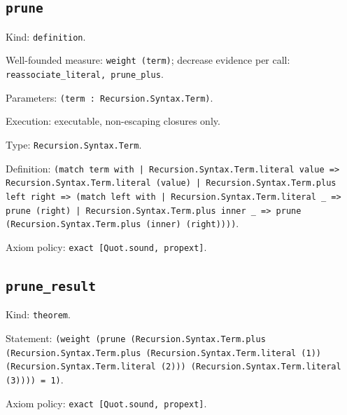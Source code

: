 \documentclass[11pt]{article}
\begin{document}
\subsection*{\texttt{prune}}
\noindent Kind: \texttt{definition}.\par
\noindent Well-founded measure: \texttt{weight (term)}; decrease evidence per call: \texttt{reassociate\_literal, prune\_plus}.\par
\noindent Parameters: \texttt{(term : Recursion.Syntax.Term)}.\par
\noindent Execution: executable, non-escaping closures only.\par
\noindent Type: \texttt{Recursion.Syntax.Term}.\par
\noindent Definition: \texttt{(match term with | Recursion.Syntax.Term.literal value => Recursion.Syntax.Term.literal (value) | Recursion.Syntax.Term.plus left right => (match left with | Recursion.Syntax.Term.literal \_ => prune (right) | Recursion.Syntax.Term.plus inner \_ => prune (Recursion.Syntax.Term.plus (inner) (right))))}.\par
\noindent Axiom policy: \texttt{exact [Quot.sound, propext]}.\par
\subsection*{\texttt{prune\_result}}
\noindent Kind: \texttt{theorem}.\par
\noindent Statement: \texttt{(weight (prune (Recursion.Syntax.Term.plus (Recursion.Syntax.Term.plus (Recursion.Syntax.Term.literal (1)) (Recursion.Syntax.Term.literal (2))) (Recursion.Syntax.Term.literal (3)))) = 1)}.\par
\noindent Axiom policy: \texttt{exact [Quot.sound, propext]}.\par
\end{document}
